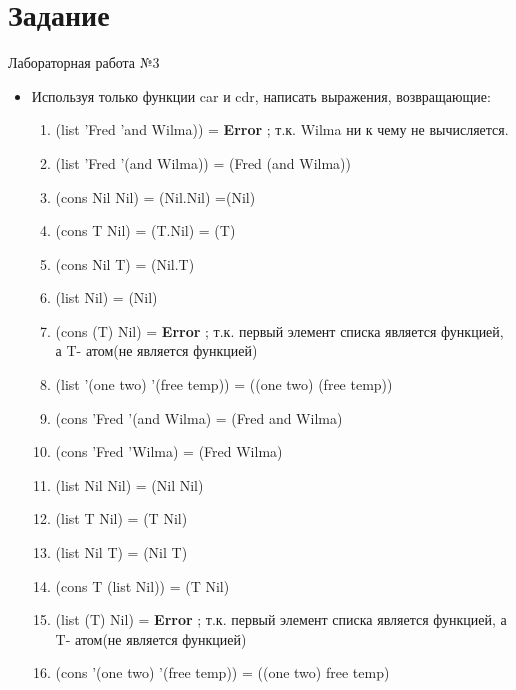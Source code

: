 \newpage
\section*{Задание}
\Large{Лабораторная работа №3}

\begin{itemize}
	\item Используя только функции car и cdr, написать выражения, возвращающие:
	\begin{enumerate}
		\item (list 'Fred 'and Wilma)) = \textbf{Error}\hspace{17pt}							;  т.к. Wilma ни к чему не вычисляется.
		\item (list 'Fred '(and Wilma)) = (Fred (and Wilma))
		\item (cons Nil Nil) = (Nil.Nil) =(Nil)
		\item (cons T Nil) = (T.Nil) = (T)
		\item (cons Nil T) = (Nil.T)
		\item (list Nil) = (Nil)
		\item (cons (T) Nil) = \textbf{Error}\hspace{70pt}										; т.к. первый элемент списка является функцией, а T- атом(не является функцией)
		\item (list '(one two) '(free temp)) = ((one two) (free temp))
		\item (cons 'Fred '(and Wilma) = (Fred and Wilma)
		\item (cons 'Fred 'Wilma) = (Fred Wilma)
		\item (list Nil Nil) = (Nil Nil)
		\item (list T Nil) = (T Nil)
		\item (list Nil T) = (Nil T)
		\item (cons T (list Nil)) = (T Nil)
		\item (list (T) Nil) = \textbf{Error}\hspace{75pt}										; т.к. первый элемент списка является функцией, а T- атом(не является функцией)
		\item (cons '(one two) '(free temp)) = ((one two) free temp)
	\end{enumerate}
\end{itemize}